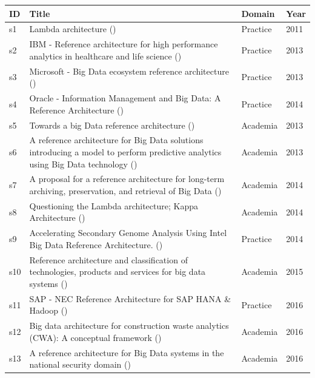 \documentclass[review]{elsarticle}
\begin{document}
\begin{longtable}{ |p{0.5cm}|p{6.5cm}|p{1.5cm}|p{0.8cm}| }
    \hline
    \textbf{ID} & \textbf{Title} & \textbf{Domain} & \textbf{Year} \\
    \hline
    s1 & Lambda architecture (\cite{kiran2015lambda}) & Practice  &  2011   \\
    \hline
    s2 & IBM - Reference architecture for high performance analytics in healthcare and life science (\cite{quintero2019ibm}) & Practice  &  2013   \\
    \hline
    s3 &  Microsoft - Big Data ecosystem reference architecture  (\cite{levin2013big}) & Practice  &  2013   \\
    \hline
    s4 &  Oracle - Information Management and Big Data: A Reference Architecture  (\cite{cackett2013information}) & Practice  &  2014   \\
    \hline
    s5 & Towards a big Data reference architecture (\cite{Maier}) & Academia  &  2013   \\
    \hline
    s6 & A reference architecture for Big Data solutions introducing a model to perform predictive analytics using Big Data technology (\cite{geerdink2013reference}) & Academia  &  2013   \\
    \hline
    s7 & A proposal for a reference architecture for long-term archiving, preservation, and retrieval of Big Data (\cite{viana2014proposal}) & Academia  &  2014   \\
    \hline
    s8 & Questioning the Lambda architecture; Kappa Architecture (\cite{kreps2014questioning}) & Academia  &  2014   \\
    \hline
    s9 & Accelerating Secondary Genome Analysis Using Intel Big Data Reference Architecture. (\cite{SikoraWohlfeld2014}) & Practice  &  2014  \\
    \hline
    s10 & Reference architecture and classification of technologies, products and services for big data systems (\cite{paakkonen2015reference}) & Academia  &  2015   \\
    \hline
    s11 &  SAP - NEC Reference Architecture for SAP HANA \& Hadoop (\cite{SAPRA}) & Practice  &  2016   \\
    \hline
    s12 & Big data architecture for construction waste analytics (CWA): A conceptual framework (\cite{bilal2016big}) & Academia  &  2016   \\
    \hline
    s13 & A reference architecture for Big Data systems in the national security domain (\cite{Klein}) & Academia  &  2016   \\

\end{longtable}
\end{document}
